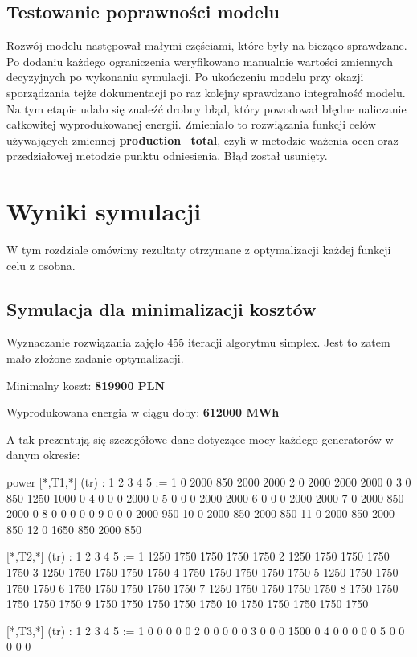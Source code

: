 \documentclass[12pt, twoside, hidelinks, a4paper]{article}
\begin{document}
\subsection{Testowanie poprawności modelu}
Rozwój modelu następował małymi częściami, które były na bieżąco sprawdzane. Po dodaniu każdego ograniczenia weryfikowano manualnie wartości zmiennych decyzyjnych po wykonaniu symulacji. Po ukończeniu modelu przy okazji sporządzania tejże dokumentacji po raz kolejny sprawdzano integralność modelu. Na tym etapie udało się znaleźć drobny błąd, który powodował błędne naliczanie całkowitej wyprodukowanej energii. Zmieniało to rozwiązania funkcji celów używających zmiennej \textbf{production\_total}, czyli w metodzie ważenia ocen oraz przedziałowej metodzie punktu odniesienia. Błąd został usunięty.

\section{Wyniki symulacji}
W tym rozdziale omówimy rezultaty otrzymane z optymalizacji każdej funkcji celu z osobna.

\subsection{Symulacja dla minimalizacji kosztów} \label{sec:cost_min}
Wyznaczanie rozwiązania zajęło 455 iteracji algorytmu simplex. Jest to zatem mało złożone zadanie optymalizacji.

Minimalny koszt: \textbf{819900 PLN}

Wyprodukowana energia w ciągu doby: \textbf{612000 MWh}

A tak prezentują się szczegółowe dane dotyczące mocy każdego generatorów w danym okresie:

\begin{boxedverbatim}
power [*,T1,*] (tr)
:    1    2      3      4      5      :=
1    0   2000    850   2000   2000
2    0   2000   2000   2000      0
3    0    850   1250   1000      0
4    0      0      0   2000      0
5    0      0      0   2000   2000
6    0      0      0   2000   2000
7    0   2000    850   2000      0
8    0      0      0      0      0
9    0      0      0   2000    950
10   0   2000    850   2000    850
11   0   2000    850   2000    850
12   0   1650    850   2000    850

 [*,T2,*] (tr)
:     1      2      3      4      5      :=
1    1250   1750   1750   1750   1750
2    1250   1750   1750   1750   1750
3    1250   1750   1750   1750   1750
4    1750   1750   1750   1750   1750
5    1250   1750   1750   1750   1750
6    1750   1750   1750   1750   1750
7    1250   1750   1750   1750   1750
8    1750   1750   1750   1750   1750
9    1750   1750   1750   1750   1750
10   1750   1750   1750   1750   1750

 [*,T3,*] (tr)
:   1   2   3    4     5    :=
1   0   0   0      0   0
2   0   0   0      0   0
3   0   0   0   1500   0
4   0   0   0      0   0
5   0   0   0      0   0
\end{boxedverbatim}
\end{document}
